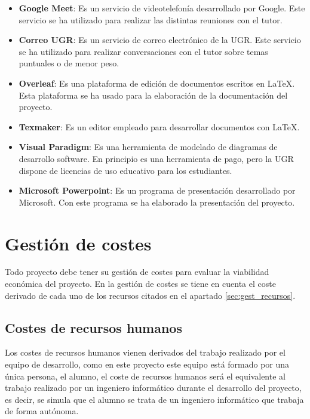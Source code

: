 \begin{itemize}
\item \textbf{Google Meet}: Es un servicio de videotelefonía desarrollado por Google. Este servicio se ha utilizado para realizar las distintas reuniones con el tutor.
\item \textbf{Correo UGR}: Es un servicio de correo electrónico de la UGR. Este servicio se ha utilizado para realizar conversaciones con el tutor sobre temas puntuales o de menor peso.
\item \textbf{Overleaf}: Es una plataforma de edición de documentos escritos en LaTeX. Esta plataforma se ha usado para la elaboración de la documentación del proyecto.
\item \textbf{Texmaker}: Es un editor empleado para desarrollar documentos con LaTeX.
\item \textbf{Visual Paradigm}: Es una herramienta de modelado de diagramas de desarrollo software. En principio es una herramienta de pago, pero la UGR dispone de licencias de uso educativo para los estudiantes.
\item \textbf{Microsoft Powerpoint}: Es un programa de presentación desarrollado por Microsoft. Con este programa se ha elaborado la presentación del proyecto.
\end{itemize}



\section{Gestión de costes}

Todo proyecto debe tener su gestión de costes para evaluar la viabilidad económica del proyecto. En la gestión de costes se tiene en cuenta el coste derivado de cada uno de los recursos citados en el apartado \ref{sec:gest_recursos}.

\subsection{Costes de recursos humanos}

Los costes de recursos humanos vienen derivados del trabajo realizado por el equipo de desarrollo, como en este proyecto este equipo está formado por una única persona, el alumno, el coste de recursos humanos será el equivalente al trabajo realizado por un ingeniero informático durante el desarrollo del proyecto, es decir, se simula que el alumno se trata de un ingeniero informático que trabaja de forma autónoma.

